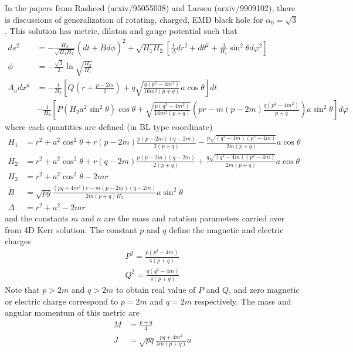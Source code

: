 \documentclass[prd]{revtex4}
\begin{document}
In the papers from Rasheed (arxiv/95055038) and Larsen (arxiv/9909102), there is discussions of generalization of rotating, charged, EMD black hole for $\alpha_0 = \sqrt{3}$. This solution has metric, dilaton and gauge potential such that 
\begin{align}
ds^2 &= -\frac{H_3}{\sqrt{H_1 H_2}} (dt + \tilde{B} d \phi)^2 + \sqrt{H_1 H_2} \left[ \frac{1}{\Delta} dr^2 + d \theta^2 + \frac{\Delta}{H_3} \sin^2 \theta d \varphi^2 \right] \\
\phi &= -\frac{\sqrt{3}}{2} \ln \sqrt{\frac{H_2}{H_1}} \\
A_a dx^a &= - \frac{1}{H_2} \left[Q \left(r + \frac{p-2m}{2} \right) + q \sqrt{\frac{q (p^2-4m^2)}{16m^2 (p+q)}} a \cos \theta\right] dt \nonumber \\
	       &- \frac{1}{H_2} \left[ P (H_2 a^2 \sin^2 \theta) \cos \theta + \sqrt{\frac{p (q^2-4m^2)}{16m^2 (p+q)}} \left(pr-m(p-2m) \frac{q (p^2-4m^2)}{p+q} \right) a \sin^2 \theta \right] d\varphi
\end{align}
where each quantities are defined (in BL type coordinate)
\begin{align}
H_1 &= r^2 + a^2 \cos^2 \theta + r (p-2m) \frac{p(p-2m)(q-2m)}{2(p+q)}-\frac{p \sqrt{(q^2-4m)(p^2-4m)}}{2m(p+q)}a \cos \theta\\
H_2 &= r^2 + a^2 \cos^2 \theta + r (q-2m) \frac{p(p-2m)(q-2m)}{2(p+q)}+\frac{q \sqrt{(q^2-4m)(p^2-4m)}}{2m(p+q)}a \cos \theta\\
H_3 &= r^2 + a^2 \cos^2 \theta - 2 m r \\
\tilde{B} &= \sqrt{pg} \frac{(pq+4m^2)r-m(p-2m)(q-2m)}{2m(p+q)H_3} a \sin^2 \theta \\
\Delta &= r^2 + a^2 - 2mr
\end{align}
and the constants $m$ and $a$ are the mass and rotation parameters carried over from 4D Kerr solution. The constant $p$ and $q$ define the magnetic and electric charges
\begin{align}
P^2 = \frac{p (p^2-4m)}{4(p+q)} \\
Q^2 = \frac{q (q^2-4m)}{4(p+q)}
\end{align}
Note that $p > 2m$ and $q > 2m$ to obtain real value of $P$ and $Q$, and zero magnetic or electric charge correspond to $p=2m$ and $q=2m$ respectively. The mass and angular momentum of this metric are
\begin{align}
M &= \frac{p+q}{4}\\
J &= \sqrt{pq} \frac{pq + 4m^2}{4m (p+q)} a
\end{align}
\end{document}
